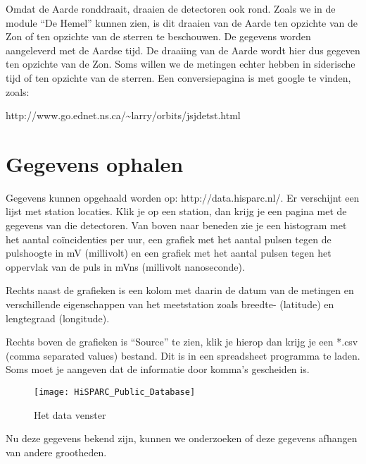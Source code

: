 Omdat de Aarde ronddraait, draaien de detectoren ook rond. Zoals we
in de module {}``De Hemel'' kunnen zien, is dit draaien van de Aarde
ten opzichte van de Zon of ten opzichte van de sterren te beschouwen.
De gegevens worden aangeleverd met de Aardse tijd. De draaiing van
de Aarde wordt hier dus gegeven ten opzichte van de Zon. Soms willen
we de metingen echter hebben in siderische tijd of ten opzichte van
de sterren. Een conversiepagina is met google te vinden, zoals:

http://www.go.ednet.ns.ca/\textasciitilde{}larry/orbits/jsjdetst.html


\section{Gegevens ophalen}

Gegevens kunnen opgehaald worden op: http://data.hisparc.nl/. Er
verschijnt een lijst met station locaties. Klik je op een station, dan
krijg je een pagina met de gegevens van die detectoren. Van boven naar
beneden zie je een histogram met het aantal coïncidenties per uur, een
grafiek met het aantal pulsen tegen de pulshoogte in mV (millivolt) en
een grafiek met het aantal pulsen tegen het oppervlak van de puls in
mVns (millivolt nanoseconde).

Rechts naast de grafieken is een kolom met daarin de datum van de
metingen en verschillende eigenschappen van het meetstation zoals
breedte- (latitude) en lengtegraad (longitude).

Rechts boven de grafieken is {}``Source'' te zien, klik je hierop
dan krijg je een {*}.csv (comma separated values) bestand. Dit is
in een spreadsheet programma te laden. Soms moet je aangeven dat de
informatie door komma's gescheiden is.

\begin{figure}[h]
\centering

\texttt{[image: HiSPARC\_Public\_Database]}

\caption{Het data venster}
\end{figure}


Nu deze gegevens bekend zijn, kunnen we onderzoeken of deze gegevens
afhangen van andere grootheden. 


